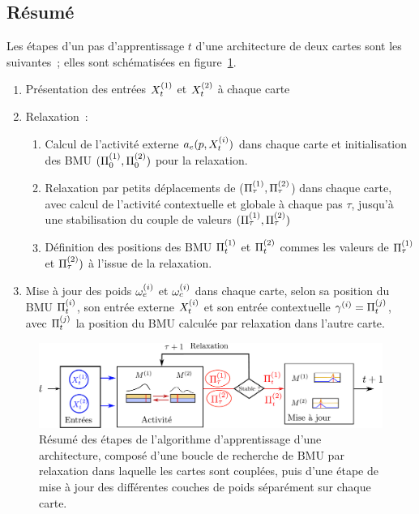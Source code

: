 \documentclass[../main]{subfiles}
\begin{document}
\subsection{Résumé}
Les étapes d'un pas d'apprentissage $t$ d'une architecture de deux cartes sont les suivantes~; elles sont schématisées en figure~\ref{fig:algo}.
\begin{enumerate}
\item Présentation des entrées $X^{({1})}_t$ et $X^{({2})}_t$ à chaque carte
\item Relaxation~:
\begin{enumerate}
\item Calcul de l'activité externe $a_e(p, X^{({i})}_t)$ dans chaque carte et initialisation des BMU $(\Pi^{({1})}_0,\Pi^{({2})}_0)$ pour la relaxation.
\item Relaxation par petits déplacements de ($\Pi^{({1})}_\tau,\Pi^{({2})}_\tau$) dans chaque carte, avec calcul de l'activité contextuelle et globale à chaque pas $\tau$, jusqu'à une stabilisation du couple de valeurs $(\Pi^{({1})}_\tau,\Pi^{({2})}_\tau)$
\item Définition des positions des BMU $\Pi^{({1})}_t$ et $\Pi^{({2})}_t$ commes les valeurs de $\Pi^{({1})}_\tau$ et $\Pi^{({2})}_\tau)$ à l'issue de la relaxation.
\end{enumerate}
\item Mise à jour des poids $\omega_{e}^{({i})}$ et $\omega_{c}^{({i})}$ dans chaque carte, selon sa position du BMU $\Pi^{({i})}_t$, son entrée externe $X^{({i})}_t$ et son entrée contextuelle $ \gamma^{({i})} = \Pi^{({j})}_t$, avec $\Pi^{({j})}_t$ la position du BMU calculée par relaxation dans l'autre carte.
\end{enumerate}

\begin{figure}
\centering
\includegraphics[width=\textwidth]{learning_tests_2maps}
\caption{Résumé des étapes de l'algorithme d'apprentissage d'une architecture, composé d'une boucle de recherche de BMU par relaxation dans laquelle les cartes sont couplées, puis d'une étape de mise à jour des différentes couches de poids séparément sur chaque carte.}
\label{fig:algo}
\end{figure}
\end{document}
